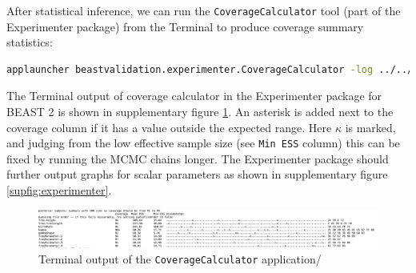 \documentclass[oneside]{article}
\begin{document}
After statistical inference, we can run the \texttt{CoverageCalculator} tool (part of the Experimenter package) from the Terminal to produce coverage summary statistics:

\vspace{.25cm}

{\scriptsize
\begin{lstlisting}[language=bash, breaklines=true]
applauncher beastvalidation.experimenter.CoverageCalculator -log ../../truth.log -logA summary -out /tmp -showRho true -showESS false -showMean false 
\end{lstlisting}
}

The Terminal output of coverage calculator in the Experimenter package for BEAST 2 is shown in supplementary figure \ref{supfig:terminal}.
An asterisk is added next to the coverage column if it has a value outside the expected range.
Here $\kappa$ is marked, and judging from the low effective sample size (see \texttt{Min ESS} column) this can be fixed by running the MCMC chains longer.
The Experimenter package should further output graphs for scalar parameters as shown in supplementary figure \ref{supfig:experimenter}.

\begin{figure}
  \includegraphics[width=\textwidth]{../figures/coveragecalculator0.png}
  \caption{Terminal output of the \texttt{CoverageCalculator} application/}
  \label{supfig:terminal}
\end{figure}
\end{document}
